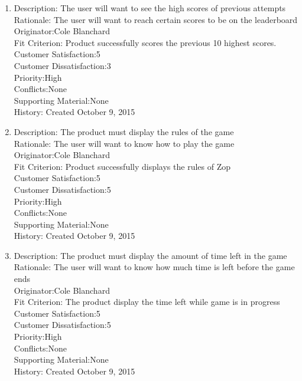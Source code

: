 \documentclass[12pt]{article}
\begin{document}
\begin{enumerate}
 \item Description: The user will want to see the high scores of previous attempts\\
 Rationale: The user will want to reach certain scores to be on the leaderboard\\
 Originator:Cole Blanchard\\
 Fit Criterion: Product successfully scores the previous 10 highest scores.\\
 Customer Satisfaction:5\\
 Customer Dissatisfaction:3\\
 Priority:High\\
 Conflicts:None\\
 Supporting Material:None\\
 History: Created October 9, 2015\\
 
 \item Description: The product must display the rules of the game\\
 Rationale: The user will want to know how to play the game\\
 Originator:Cole Blanchard\\
 Fit Criterion: Product successfully displays the rules of Zop\\
 Customer Satisfaction:5\\
 Customer Dissatisfaction:5\\
 Priority:High\\
 Conflicts:None\\
 Supporting Material:None\\
 History: Created October 9, 2015\\
 
 \item Description: The product must display the amount of time left in the game\\
 Rationale: The user will want to know how much time is left before the game ends\\
 Originator:Cole Blanchard\\
 Fit Criterion: The product display the time left while game is in progress\\
 Customer Satisfaction:5\\
 Customer Dissatisfaction:5\\
 Priority:High\\
 Conflicts:None\\
 Supporting Material:None\\
 History: Created October 9, 2015\\
 

\end{enumerate}
\end{document}
